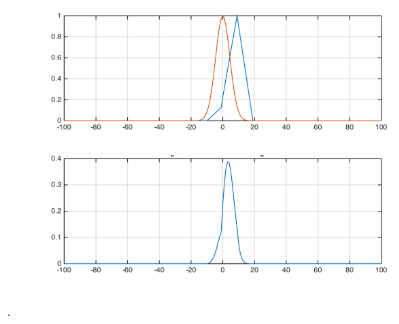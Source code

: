 \begin{figure}[htbp]
    \centering
    \begin{subfigure}[b]{0.9\textwidth}
        \includegraphics[width=\textwidth]{./Template_Figures/normal_ccr}
        \caption{}\label{fig:normal_ccr}
    \end{subfigure}

    \begin{subfigure}[b]{0.9\textwidth}
        \includegraphics[width=\textwidth]{./Template_Figures/windowed_ccr}
        \caption{}\label{fig:windowed_ccr}
    \end{subfigure}

    \caption{.\label{fig:windowed_ccr_f}}
\end{figure}

